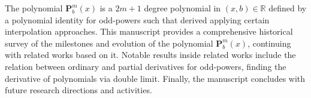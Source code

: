 The polynomial $\mathbf{P}^m_b(x)$ is a $2m+1$ degree polynomial in $(x,b) \in \mathbb{R}$
defined by a polynomial identity for odd-powers such that derived applying certain interpolation approaches.
This manuscript provides a comprehensive historical survey of the milestones and evolution of the polynomial
$\mathbf{P}^m_b(x)$, continuing with related works based on it.
Notable results inside related works include the relation between ordinary and partial derivatives for odd-powers,
finding the derivative of polynomials via double limit.
Finally, the manuscript concludes with future research directions and activities.



